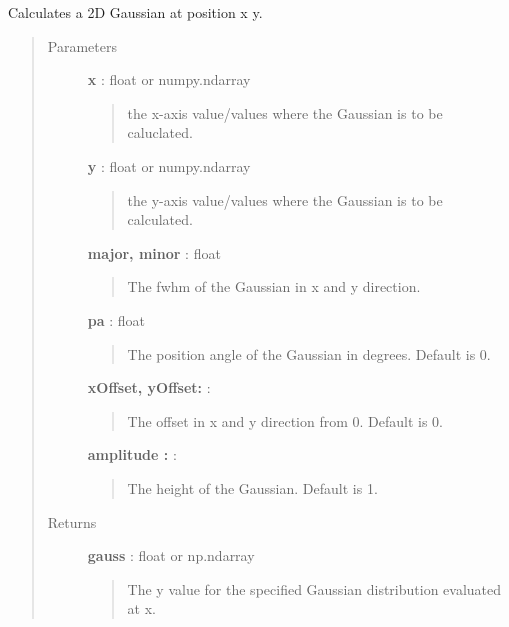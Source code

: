 \documentclass[a4paper,10pt,english]{sphinxmanual}
\begin{document}

\begin{fulllineitems}
\label{functions:astrolyze.functions.astro_functions.gauss2D}
Calculates a 2D Gaussian at position x y.
\begin{quote}\begin{description}
\item[{Parameters }] \leavevmode
\textbf{x} : float or numpy.ndarray
\begin{quote}

the x-axis value/values where the Gaussian is to be caluclated.
\end{quote}

\textbf{y} : float or numpy.ndarray
\begin{quote}

the y-axis value/values where the Gaussian is to be calculated.
\end{quote}

\textbf{major, minor} : float
\begin{quote}

The fwhm of the Gaussian in x and y direction.
\end{quote}

\textbf{pa} : float
\begin{quote}

The position angle of the Gaussian in degrees. Default is 0.
\end{quote}

\textbf{xOffset, yOffset:} :
\begin{quote}

The offset in x and y direction from 0. Default is 0.
\end{quote}

\textbf{amplitude :} :
\begin{quote}

The height of the Gaussian. Default is 1.
\end{quote}

\item[{Returns }] \leavevmode
\textbf{gauss} : float or np.ndarray
\begin{quote}

The y value for the specified Gaussian distribution evaluated at x.
\end{quote}


\end{description}
\end{quote}
\end{fulllineitems}
\end{document}

